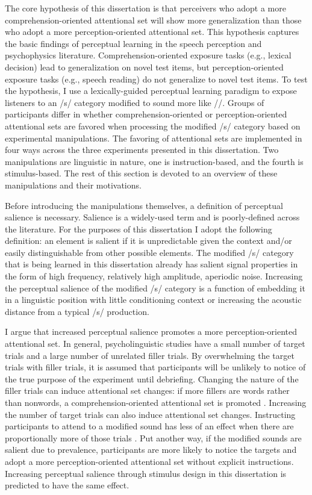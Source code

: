 The core hypothesis of this dissertation is that perceivers who adopt a more comprehension-oriented attentional set will show more generalization than those who adopt a more perception-oriented attentional set.
This hypothesis captures the basic findings of perceptual learning in the speech perception and psychophysics literature.
Comprehension-oriented exposure tasks (e.g., lexical decision) lead to generalization on novel test items, but perception-oriented exposure tasks (e.g., speech reading) do not generalize to novel test items.
To test the hypothesis, I use a lexically-guided perceptual learning paradigm to expose listeners to an /s/ category modified to sound more like /\textesh/.  
Groups of participants differ in whether comprehension-oriented or perception-oriented attentional sets are favored when processing the modified /s/ category based on experimental manipulations.
The favoring of attentional sets are implemented in four ways across the three experiments presented in this dissertation.  
Two manipulations are linguistic in nature, one is instruction-based, and the fourth is stimulus-based.
The rest of this section is devoted to an overview of these manipulations and their motivations.

Before introducing the manipulations themselves, a definition of perceptual salience is necessary.
Salience is a widely-used term and is poorly-defined across the literature.
For the purposes of this dissertation I adopt the following definition:  an element is salient if it is unpredictable given the context and/or easily distinguishable from other possible elements.  
The modified /s/ category that is being learned in this dissertation already has salient signal properties in the form of high frequency, relatively high amplitude, aperiodic noise.
Increasing the perceptual salience of the modified /s/ category is a function of embedding it in a linguistic position with little conditioning context or increasing the acoustic distance from a typical /s/ production.

I argue that increased perceptual salience promotes a more perception-oriented attentional set.
In general, psycholinguistic studies have a small number of target trials and a large number of unrelated filler trials.
By overwhelming the target trials with filler trials, it is assumed that participants will be unlikely to notice of the true purpose of the experiment until debriefing.
Changing the nature of the filler trials can induce attentional set changes: if more fillers are words rather than nonwords, a comprehension-oriented attentional set is promoted \citep{Mirman2008}.
Increasing the number of target trials can also induce attentional set changes.
Instructing participants to attend to a modified sound has less of an effect when there are proportionally more of those trials \citep{Pitt2012}.
Put another way, if the modified sounds are salient due to prevalence, participants are more likely to notice the targets and adopt a more perception-oriented attentional set without explicit instructions.
Increasing perceptual salience through stimulus design in this dissertation is predicted to have the same effect.

